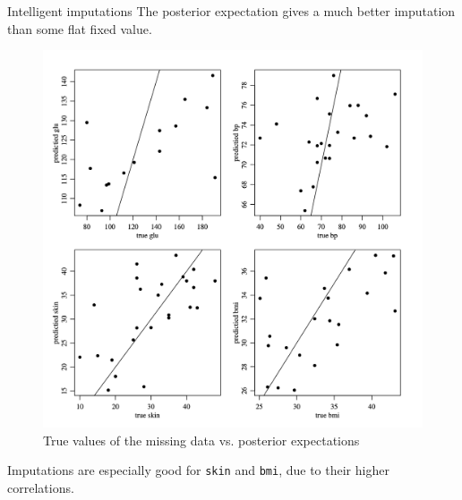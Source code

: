\documentclass[10pt]{beamer}
\begin{document}
\begin{frame}{Intelligent imputations}
The posterior expectation gives a much better imputation than some flat fixed value.

\begin{figure}
\includegraphics[width=.45\textwidth]{images/pima_missing_vs_true}
\caption{True values of the missing data vs. posterior expectations}
\end{figure}

\pause 
 Imputations are especially good for \texttt{skin} and \texttt{bmi},  due to their higher correlations.  

\end{frame}
\end{document}
